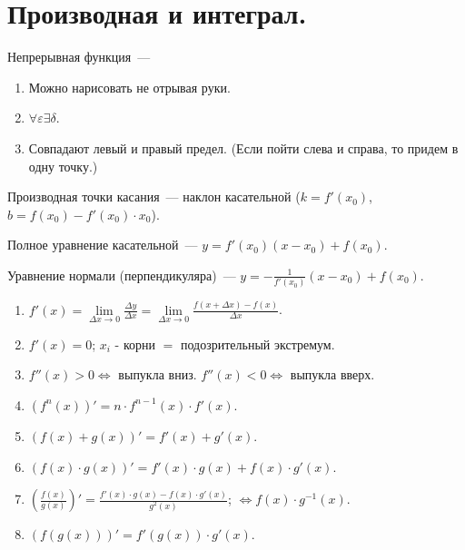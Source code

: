 \documentclass[12pt]{article}
\begin{document}
	\section{Производная и интеграл.}
	\begin{definition}
		Непрерывная функция~---
		\begin{enumerate}
			\item Можно нарисовать не отрывая руки.
			\item $\forall \varepsilon \exists \delta$.
			\item Совпадают левый и правый предел. (Если пойти слева и справа, то придем в одну точку.)
		\end{enumerate}
	\end{definition}
	\begin{statement}
		Производная точки касания~--- наклон касательной ($k = f'(x_0)$, $b = f(x_0) - f'(x_0) \cdot x_0$).
	\end{statement}
	\begin{statement}
		Полное уравнение касательной~--- $y = f'(x_0)(x - x_0) + f(x_0)$.
	\end{statement}
	\begin{definition}
		Уравнение нормали (перпендикуляра)~--- $y = -\frac{1}{f'(x_0)}(x - x_0) + f(x_0)$.
	\end{definition}
	\begin{property}
		\begin{enumerate}
			\item $f'(x) = \lim\limits_{\varDelta x \rightarrow 0} \frac{\varDelta y}{\varDelta x} = \lim\limits_{\varDelta x \rightarrow 0} \frac{f(x + \varDelta x) - f(x)}{\varDelta x}$.
			\item $f'(x) = 0$; $x_i$ - корни $=$ подозрительный экстремум.
			\item $f''(x) > 0 \Leftrightarrow$ выпукла вниз. $f''(x) < 0 \Leftrightarrow$ выпукла вверх.
			\item $(f^n(x))' = n \cdot f^{n - 1}(x) \cdot f'(x)$.
			\item $(f(x) + g(x))' = f'(x) + g'(x)$.
			\item $(f(x) \cdot g(x))' = f'(x) \cdot g(x) + f(x) \cdot g'(x)$.
			\item $(\frac{f(x)}{g(x)})' = \frac{f'(x) \cdot g(x) - f(x) \cdot g'(x)}{g^2(x)}$; $\Leftrightarrow f(x) \cdot g^{-1}(x)$.
			\item $(f(g(x)))' = f'(g(x)) \cdot g'(x)$.
		\end{enumerate}
	\end{property}
\end{document}

